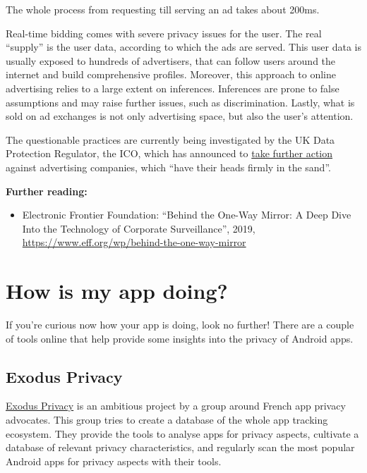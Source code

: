 \documentclass[
]{book}
\providecommand{\tightlist}{%
  \setlength{\itemsep}{0pt}\setlength{\parskip}{0pt}}
\begin{document}
The whole process from requesting till serving an ad takes about 200ms.

Real-time bidding comes with severe privacy issues for the user. The real ``supply'' is the user data, according to which the ads are served. This user data is usually exposed to hundreds of advertisers, that can follow users around the internet and build comprehensive profiles. Moreover, this approach to online advertising relies to a large extent on inferences. Inferences are prone to false assumptions and may raise further issues, such as discrimination. Lastly, what is sold on ad exchanges is not only advertising space, but also the user's attention.

The questionable practices are currently being investigated by the UK Data Protection Regulator, the ICO, which has announced to \href{https://ico.org.uk/about-the-ico/news-and-events/news-and-blogs/2020/01/blog-adtech-the-reform-of-real-time-bidding-has-started/}{take further action} against advertising companies, which ``have their heads firmly in the sand''.

\textbf{Further reading:}

\begin{itemize}
\tightlist
\item
  Electronic Frontier Foundation: ``Behind the One-Way Mirror: A Deep Dive Into the Technology of Corporate Surveillance'', 2019, \url{https://www.eff.org/wp/behind-the-one-way-mirror}
\end{itemize}

\hypertarget{how-is-my-app-doing}{%
\section{How is my app doing?}\label{how-is-my-app-doing}}

If you're curious now how your app is doing, look no further! There are a couple of tools online that help provide some insights into the privacy of Android apps.

\hypertarget{exodus-privacy}{%
\subsection{Exodus Privacy}\label{exodus-privacy}}

\href{https://reports.exodus-privacy.eu.org/en/}{Exodus Privacy} is an ambitious project by a group around French app privacy advocates. This group tries to create a database of the whole app tracking ecosystem. They provide the tools to analyse apps for privacy aspects, cultivate a database of relevant privacy characteristics, and regularly scan the most popular Android apps for privacy aspects with their tools.
\end{document}
